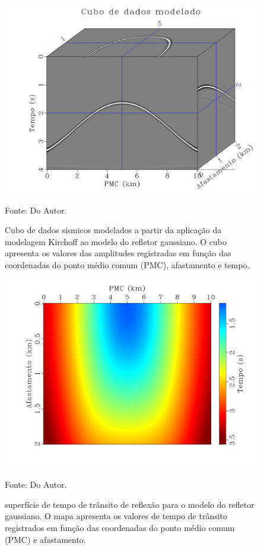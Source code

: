 \begin{figure}[htb]
\caption{Cubo de dados sísmicos modelados a partir da aplicação da modelagem Kirchoff ao modelo
do refletor gaussiano. O cubo apresenta os valores das amplitudes registradas em função das coordenadas do
ponto médio comum (PMC), afastamento e tempo.}
\begin{center}
\includegraphics[scale=0.3]{images/dataCube.jpeg}
\vspace{-0.3cm}
\end{center}
\begin{center}
 Fonte: Do Autor.
\end{center}
\label{fig:5.2}
\end{figure}

\begin{figure}[htb]
\caption{superfície de tempo de trânsito de reflexão para o modelo do refletor gaussiano.
O mapa apresenta os valores de tempo de trânsito registrados em função das coordenadas do
ponto médio comum (PMC) e afastamento.}
\begin{center}
\includegraphics[scale=0.3]{images/reflectionSurface.jpeg}
\vspace{-0.3cm}
\end{center}
\begin{center}
 Fonte: Do Autor.
\end{center}
\label{fig:5.3}
\end{figure}


